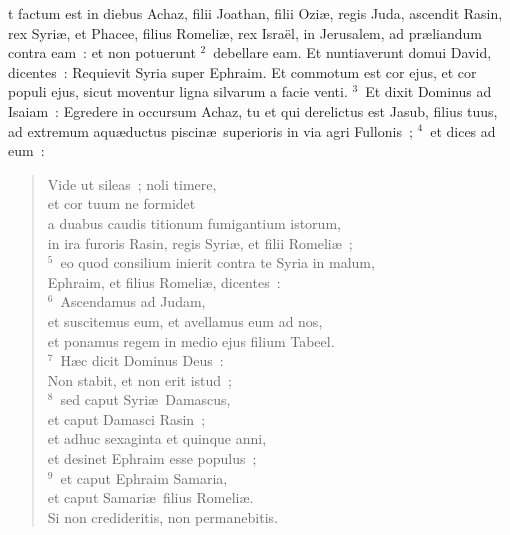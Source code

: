 \bchapter
{}t factum est in diebus Achaz, filii Joathan, filii Ozi\ae , regis Juda, ascendit Rasin, rex Syri\ae , et Phacee, filius Romeli\ae , rex Isra\"el, in Jerusalem, ad pr\ae liandum contra eam~: et non potuerunt
${}^{2}$~debellare eam. Et nuntiaverunt domui David, dicentes~: Requievit Syria super Ephraim. Et commotum est cor ejus, et cor populi ejus, sicut moventur ligna silvarum a facie venti.
${}^{3}$~Et dixit Dominus ad Isaiam~: Egredere in occursum Achaz, tu et qui derelictus est Jasub, filius tuus, ad extremum aqu\ae ductus piscin\ae\ superioris in via agri Fullonis~;
${}^{4}$~et dices ad eum~: \begin{verse}Vide ut sileas~; noli timere,\\ et cor tuum ne formidet\\ a duabus caudis titionum fumigantium istorum,\\ in ira furoris Rasin, regis Syri\ae , et filii Romeli\ae~;\\
${}^{5}$~eo quod consilium inierit contra te Syria in malum,\\ Ephraim, et filius Romeli\ae , dicentes~:\\
${}^{6}$~Ascendamus ad Judam,\\ et suscitemus eum, et avellamus eum ad nos,\\ et ponamus regem in medio ejus filium Tabeel.\\
${}^{7}$~H\ae c dicit Dominus Deus~:\\ Non stabit, et non erit istud~;\\
${}^{8}$~sed caput Syri\ae\ Damascus,\\ et caput Damasci Rasin~;\\ et adhuc sexaginta et quinque anni,\\ et desinet Ephraim esse populus~;\\
${}^{9}$~et caput Ephraim Samaria,\\ et caput Samari\ae\ filius Romeli\ae .\\ Si non credideritis, non permanebitis.\end{verse}


